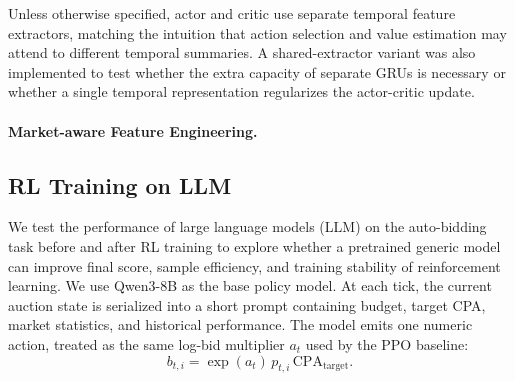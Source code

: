 \documentclass{article}
\begin{document}
Unless otherwise specified, actor and critic use
separate temporal feature extractors, matching the intuition that action
selection and value estimation may attend to different temporal summaries.
A shared-extractor variant was also implemented to test whether the extra
capacity of separate GRUs is necessary or whether a single temporal
representation regularizes the actor-critic update.



\paragraph{Market-aware Feature Engineering.}

\subsection{RL Training on LLM}
We test the performance of large language models (LLM) on the auto-bidding task
before and after RL training to explore whether a pretrained generic model can
improve final score, sample efficiency, and training stability of reinforcement learning. We use Qwen3-8B
as the base policy model. At each tick, the current auction state is serialized
into a short prompt containing budget, target CPA, market statistics, and historical
performance. The model emits one numeric action, treated as the same log-bid
multiplier $a_t$ used by the PPO baseline:
\[
  b_{t,i} = \exp(a_t)\, p_{t,i}\,\mathrm{CPA}_{\mathrm{target}}.
\]
\end{document}
